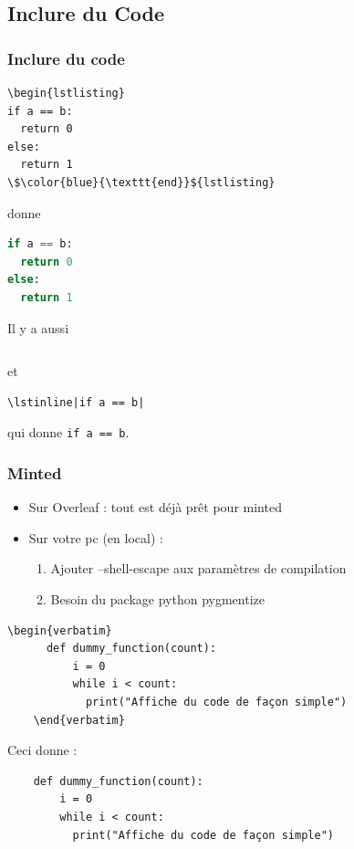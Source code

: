\subsection{Inclure du Code}

\begin{frame}[fragile]
  \frametitle{Inclure du code}
  \begin{lstlisting}[mathescape=true]
\begin{lstlisting}
if a == b:
  return 0
else:
  return 1
\$\color{blue}{\texttt{end}}${lstlisting}\end{lstlisting}
donne
  \begin{lstlisting}[language=Python]
if a == b:
  return 0
else:
  return 1\end{lstlisting}

  Il y a aussi
  \begin{lstlisting}
\end{lstlisting}
  et
  \begin{lstlisting}
\lstinline|if a == b|\end{lstlisting}
  qui donne \lstinline|if a == b|.
\end{frame}


\begin{frame}[fragile]
  \frametitle{Minted}

  \begin{itemize}
    \item Sur Overleaf : tout est déjà prêt pour minted
    \item Sur votre pc (en local) :
    \begin{enumerate}
      \item Ajouter --shell-escape aux paramètres de compilation
      \item Besoin du package python pygmentize
    \end{enumerate}
  \end{itemize}

  \begin{lstlisting}[mathescape=true]
    \begin{verbatim}
      def dummy_function(count):
          i = 0
          while i < count:
            print("Affiche du code de façon simple")
    \end{verbatim}\end{lstlisting}

  Ceci donne :

  \begin{verbatim}
    def dummy_function(count):
        i = 0
        while i < count:
          print("Affiche du code de façon simple")
  \end{verbatim}
\end{frame}

